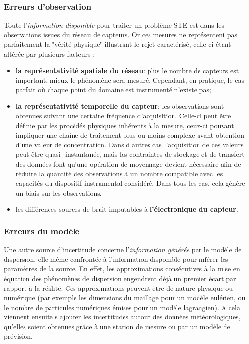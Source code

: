 	
	\subsubsection{Erreurs d'observation}
	Toute l'\textit{information disponible} pour traiter un problème STE est  dans les observations issues du réseau de capteurs. Or ces mesures ne représentent pas parfaitement la "vérité physique" illustrant le rejet caractérisé, celle-ci étant altérée par plusieurs facteurs : \\
	
	\begin{itemize}
		\item \textbf{la représentativité spatiale du réseau}: plus le nombre de capteurs est important, mieux le phénomène sera mesuré. Cependant, en pratique, le cas parfait où chaque point du domaine est instrumenté n'existe pas;
		\item \textbf{la représentativité temporelle du capteur}: les observations sont obtenues suivant une certaine fréquence d'acquisition. Celle-ci peut être définie par les procédés physiques inhérents à la mesure, ceux-ci pouvant impliquer une chaîne de traitement plus ou moins complexe avant obtention d'une valeur de concentration. Dans d'autres cas l'acquisition de ces valeurs peut être quasi- instantanée, mais les contraintes de stockage et de transfert des données font qu'une opération de moyennage devient nécessaire afin de réduire la quantité des observations à un nombre compatible avec les capacités du dispositif instrumental considéré. Dans tous les cas, cela génère un biais sur les observations.
		\item les différences sources de bruit imputables à \textbf{l'électronique du capteur}.\\
	\end{itemize}
	
	\subsubsection{Erreurs du modèle}
	Une autre source d'incertitude concerne l'\textit{information générée} par le modèle de dispersion, elle-même confrontée à l'information disponible pour inférer les paramètres de la source. En effet, les approximations consécutives à la mise en équation des phénomènes de dispersion engendrent déjà un premier écart par rapport à la réalité. Ces approximations peuvent être de nature physique ou numérique (par exemple les dimensions du maillage pour un modèle eulérien, ou le nombre de particules numériques émises pour un modèle lagrangien). A cela viennent ensuite s'ajouter les incertitudes autour des données météorologiques, qu'elles soient obtenues grâce à une station de mesure ou par un modèle de prévision. \\
	
